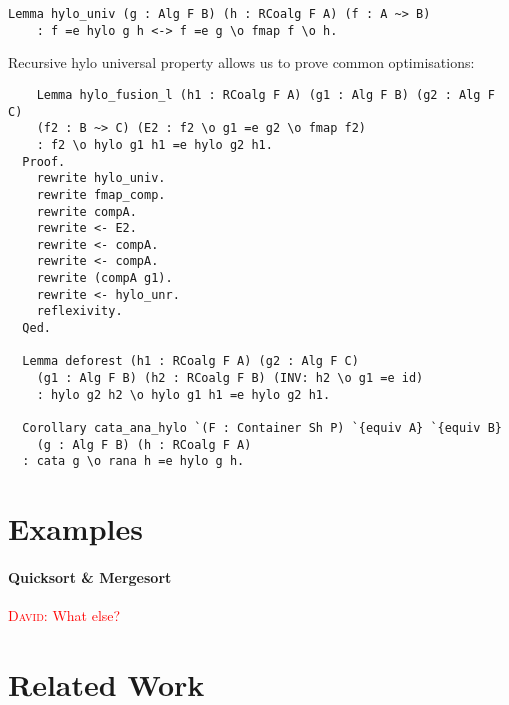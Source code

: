\documentclass[a4paper, UKenglish, cleveref, autoref, thm-restate]{lipics-v2021}
\newcommand{\dcas}[1]{\textcolor{red}{\textsc{David}: #1}}
\begin{document}
\begin{verbatim}
Lemma hylo_univ (g : Alg F B) (h : RCoalg F A) (f : A ~> B)
    : f =e hylo g h <-> f =e g \o fmap f \o h.
\end{verbatim}

Recursive hylo universal property allows us to prove common optimisations:

\begin{verbatim}
    Lemma hylo_fusion_l (h1 : RCoalg F A) (g1 : Alg F B) (g2 : Alg F C)
    (f2 : B ~> C) (E2 : f2 \o g1 =e g2 \o fmap f2)
    : f2 \o hylo g1 h1 =e hylo g2 h1.
  Proof.
    rewrite hylo_univ.
    rewrite fmap_comp.
    rewrite compA.
    rewrite <- E2.
    rewrite <- compA.
    rewrite <- compA.
    rewrite (compA g1).
    rewrite <- hylo_unr.
    reflexivity.
  Qed.

  Lemma deforest (h1 : RCoalg F A) (g2 : Alg F C)
    (g1 : Alg F B) (h2 : RCoalg F B) (INV: h2 \o g1 =e id)
    : hylo g2 h2 \o hylo g1 h1 =e hylo g2 h1.

  Corollary cata_ana_hylo `(F : Container Sh P) `{equiv A} `{equiv B}
    (g : Alg F B) (h : RCoalg F A)
  : cata g \o rana h =e hylo g h.
\end{verbatim}

\section{Examples}

\paragraph{Quicksort \& Mergesort}

\dcas{What else?}


\section{Related Work}
\end{document}
